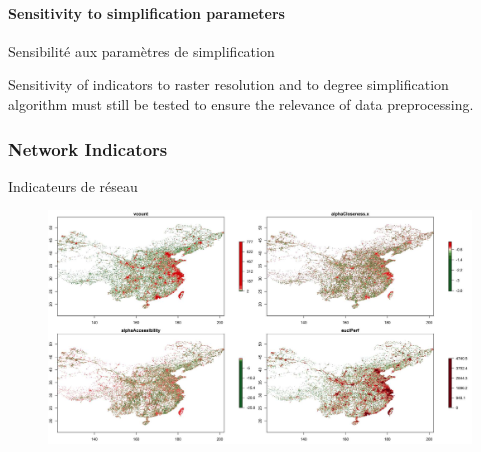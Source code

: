 \paragraph{Sensitivity to simplification parameters}{Sensibilité aux paramètres de simplification}

Sensitivity of indicators to raster resolution and to degree simplification algorithm must still be tested to ensure the relevance of data preprocessing.







\subsubsection{Network Indicators}{Indicateurs de réseau}


\begin{figure}
\includegraphics[width=\linewidth]{Figures/Final/A-staticcorrelations-networkcn.jpg}
\label{fig:app:staticcorrelations:networkcn}
\end{figure}







